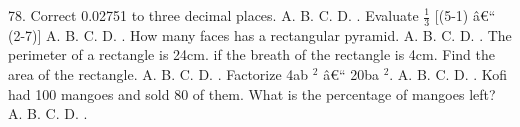 \documentclass{article}
\begin{document}
\begin{multicols}{2}
78. Correct 0.02751 to three decimal places. \newline \indent A. \newline \indent B. \newline \indent C. \newline \indent D.  \newline{}.  Evaluate \(\frac{1}{3}\) [(5-1) â€“ (2-7)] \newline \indent A. \newline \indent B. \newline \indent C. \newline \indent D.  \newline{}. How many faces has a rectangular pyramid. \newline \indent A. \newline \indent B. \newline \indent C. \newline \indent D.  \newline{}. The perimeter of a rectangle is 24cm. if the breath of the rectangle is 4cm. Find the area of the rectangle. \newline \indent A. \newline \indent B. \newline \indent C. \newline \indent D.  \newline{}. Factorize 4ab \(^2\) â€“ 20ba \(^2\). \newline \indent A. \newline \indent B. \newline \indent C. \newline \indent D.  \newline{}. Kofi had 100 mangoes and sold 80 of them. What is the percentage of mangoes left? \newline \indent A. \newline \indent B. \newline \indent C. \newline \indent D.  \newline{}. 
\end{multicols}
\end{document}
